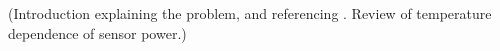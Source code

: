 
(Introduction explaining the problem, and referencing \cite{Beck:2010zzd}.
Review of temperature dependence of sensor power.)
